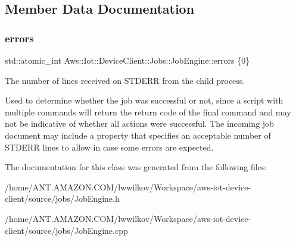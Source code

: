\subsection{Member Data Documentation}
\mbox{\label{class_aws_1_1_iot_1_1_device_client_1_1_jobs_1_1_job_engine_a1cac8361d8365feb7b0e5807abc07e33}} 
\subsubsection{\texorpdfstring{errors}{errors}}
{\footnotesize\ttfamily std\+::atomic\+\_\+int Aws\+::\+Iot\+::\+Device\+Client\+::\+Jobs\+::\+Job\+Engine\+::errors \{0\}\hspace{0.3cm}{\ttfamily [private]}}



The number of lines received on S\+T\+D\+E\+RR from the child process. 

Used to determine whether the job was successful or not, since a script with multiple commands will return the return code of the final command and may not be indicative of whether all actions were successful. The incoming job document may include a property that specifies an acceptable number of S\+T\+D\+E\+RR lines to allow in case some errors are expected. 

The documentation for this class was generated from the following files\+:\begin{DoxyCompactItemize}
\item 
/home/\+A\+N\+T.\+A\+M\+A\+Z\+O\+N.\+C\+O\+M/lwwilkov/\+Workspace/aws-\/iot-\/device-\/client/source/jobs/Job\+Engine.\+h\item 
/home/\+A\+N\+T.\+A\+M\+A\+Z\+O\+N.\+C\+O\+M/lwwilkov/\+Workspace/aws-\/iot-\/device-\/client/source/jobs/Job\+Engine.\+cpp\end{DoxyCompactItemize}
